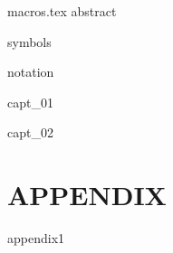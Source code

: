 \documentclass[oneside,english]{book}
\theoremstyle{plain}
\theoremstyle{definition}
\theoremstyle{definition}
\theoremstyle{plain}
\theoremstyle{myExamStyle}
\theoremstyle{myDefinitionStyle}
\theoremstyle{named}
\begin{document}
\runfrontend{}

{macros.tex}
{abstract}

\sumario

\listadefiguras

\listadetabelas

\markboth{}{}

{symbols}

{notation}

\mainmatter 
\setcounter{page}{1} \pagestyle{plain} 

{capt_01}

{capt_02}

\part*{APPENDIX}


\appendix
{appendix1}




\end{document}
